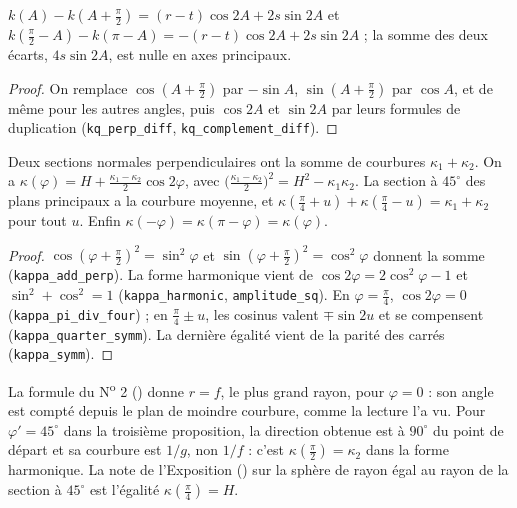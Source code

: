 \begin{enonce}
$k(A) - k(A + \frac\pi2) = (r - t)\cos 2A + 2s\sin 2A$ et $k(\frac\pi2 - A) - k(\pi - A) = -(r - t)\cos 2A + 2s\sin 2A$ ; la somme des deux écarts, $4s\sin 2A$, est nulle en axes principaux.
\end{enonce}

\begin{proof}
On remplace $\cos(A + \frac\pi2)$ par $-\sin A$, $\sin(A + \frac\pi2)$ par $\cos A$, et de même pour les autres angles, puis $\cos 2A$ et $\sin 2A$ par leurs formules de duplication (\texttt{kq\_perp\_diff}, \texttt{kq\_complement\_diff}).
\end{proof}

\begin{enonce}
Deux sections normales perpendiculaires ont la somme de courbures $\kappa_1 + \kappa_2$. On a $\kappa(\varphi) = H + \frac{\kappa_1 - \kappa_2}2\cos 2\varphi$, avec $\bigl(\frac{\kappa_1 - \kappa_2}2\bigr)^2 = H^2 - \kappa_1\kappa_2$. La section à $45^\circ$ des plans principaux a la courbure moyenne, et $\kappa(\frac\pi4 + u) + \kappa(\frac\pi4 - u) = \kappa_1 + \kappa_2$ pour tout $u$. Enfin $\kappa(-\varphi) = \kappa(\pi - \varphi) = \kappa(\varphi)$.
\end{enonce}

\begin{proof}
$\cos(\varphi + \frac\pi2)^2 = \sin^2\varphi$ et $\sin(\varphi + \frac\pi2)^2 = \cos^2\varphi$ donnent la somme (\texttt{kappa\_add\_perp}). La forme harmonique vient de $\cos 2\varphi = 2\cos^2\varphi - 1$ et $\sin^2 + \cos^2 = 1$ (\texttt{kappa\_harmonic}, \texttt{amplitude\_sq}). En $\varphi = \frac\pi4$, $\cos 2\varphi = 0$ (\texttt{kappa\_pi\_div\_four}) ; en $\frac\pi4 \pm u$, les cosinus valent $\mp\sin 2u$ et se compensent (\texttt{kappa\_quarter\_symm}). La dernière égalité vient de la parité des carrés (\texttt{kappa\_symm}).
\end{proof}

\begin{remarque}
La formule du N\textsuperscript{o} 2 () donne $r = f$, le plus grand rayon, pour $\varphi = 0$ : son angle est compté depuis le plan de moindre courbure, comme la lecture l'a vu. Pour $\varphi' = 45^\circ$ dans la troisième proposition, la direction obtenue est à $90^\circ$ du point de départ et sa courbure est $1/g$, non $1/f$ : c'est $\kappa(\frac\pi2) = \kappa_2$ dans la forme harmonique. La note de l'Exposition () sur la sphère de rayon égal au rayon de la section à $45^\circ$ est l'égalité $\kappa(\frac\pi4) = H$.
\end{remarque}

